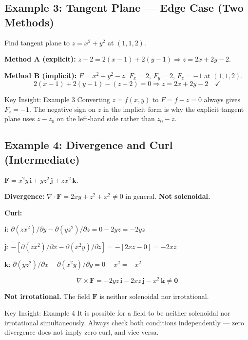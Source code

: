 \documentclass[12pt,a4paper]{article}
\begin{document}
\subsection*{Example 3: Tangent Plane --- Edge Case (Two Methods)}

Find tangent plane to $z = x^2 + y^2$ at $(1,1,2)$.

\textbf{Method A (explicit):} $z - 2 = 2(x-1) + 2(y-1) \Rightarrow z = 2x + 2y - 2$.

\textbf{Method B (implicit):} $F = x^2+y^2-z$. $F_x=2$, $F_y=2$, $F_z=-1$ at $(1,1,2)$.
\[
2(x-1)+2(y-1)-(z-2)=0 \Rightarrow z = 2x+2y-2 \quad \checkmark
\]

\begin{learnbox}{Key Insight: Example 3}
Converting $z=f(x,y)$ to $F=f-z=0$ always gives $F_z=-1$. The negative sign on $z$ in the implicit form is why the explicit tangent plane uses $z-z_0$ on the left-hand side rather than $z_0-z$.
\end{learnbox}

\subsection*{Example 4: Divergence and Curl (Intermediate)}

$\mathbf{F} = x^2 y\,\mathbf{i} + yz^2\,\mathbf{j} + zx^2\,\mathbf{k}$.

\textbf{Divergence:} $\nabla \cdot \mathbf{F} = 2xy + z^2 + x^2 \neq 0$ in general. \textbf{Not solenoidal.}

\textbf{Curl:}

$\mathbf{i}$: $\partial(zx^2)/\partial y - \partial(yz^2)/\partial z = 0 - 2yz = -2yz$

$\mathbf{j}$: $-[\partial(zx^2)/\partial x - \partial(x^2 y)/\partial z] = -[2xz - 0] = -2xz$

$\mathbf{k}$: $\partial(yz^2)/\partial x - \partial(x^2 y)/\partial y = 0 - x^2 = -x^2$

\[
  \nabla \times \mathbf{F} = -2yz\,\mathbf{i} - 2xz\,\mathbf{j} - x^2\,\mathbf{k} \neq \mathbf{0}
\]

\textbf{Not irrotational.} The field $\mathbf{F}$ is neither solenoidal nor irrotational.

\begin{learnbox}{Key Insight: Example 4}
It is possible for a field to be neither solenoidal nor irrotational simultaneously. Always check both conditions independently --- zero divergence does not imply zero curl, and vice versa.
\end{learnbox}
\end{document}
